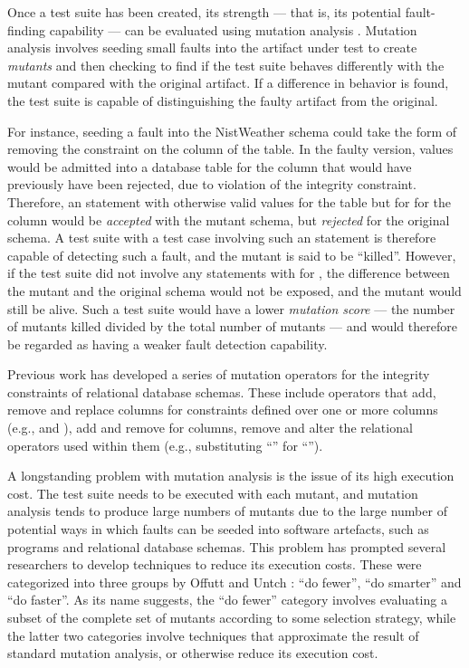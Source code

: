 Once a test suite has been created, its strength --- that is, its potential fault-finding capability --- can be evaluated using mutation analysis \cite{Jia2011}. Mutation analysis involves seeding small faults into the artifact under test to create {\it mutants} and then checking to find if the test suite behaves differently with the mutant compared with the original artifact. If a difference in behavior is found, the test suite is capable of distinguishing the faulty artifact from the original.

For instance, seeding a fault into the NistWeather schema could take the form of removing the \NOTNULL constraint on the  column of the  table. In the faulty version, \NULL values would be admitted into a database table for the  column that would have previously have been rejected, due to violation of the integrity constraint. Therefore, an \INSERT statement with otherwise valid values for the  table but for \NULL for the  column would be {\it accepted} with the mutant schema, but {\it rejected} for the original schema. A test suite with a test case involving such an \INSERT statement is therefore capable of detecting such a fault, and the mutant is said to be ``killed''. However, if the test suite did not involve any \INSERT statements with \NULL for , the difference between the mutant and the original schema would not be exposed, and the mutant would still be alive. Such a test suite would have a lower {\it mutation score} --- the number of mutants killed divided by the total number of mutants --- and would therefore be regarded as having a weaker fault detection capability.

Previous work \cite{Kapfhammer2013,Wright2013,Wright2014} has developed a series of mutation operators for the integrity constraints of relational database schemas. These include operators that add, remove and replace columns for constraints defined over one or more columns (e.g., \PK and \FKCs), add and remove \NNCs for columns, remove \CCs and alter the relational operators used within them (e.g., substituting ``\sql{>}'' for ``\sql{>=}'').

A longstanding problem with mutation analysis is the issue of its high execution cost. The test suite needs to be executed with each mutant, and mutation analysis tends to produce large numbers of mutants due to the large number of potential ways in which faults can be seeded into software artefacts, such as programs and relational database schemas. This
problem
has prompted several researchers to develop techniques to reduce its execution costs. These were categorized into three groups by Offutt and Untch \cite{Offutt2001}: ``do fewer'', ``do smarter'' and ``do faster''. As its name suggests, the ``do fewer'' category involves evaluating a subset of the complete set of mutants according to some selection strategy, while the latter two categories involve techniques that approximate the result of standard mutation analysis, or otherwise reduce its execution cost.

